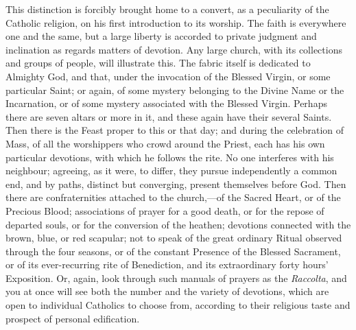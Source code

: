This distinction is forcibly brought home to a convert, as a
peculiarity of the Catholic religion, on his first introduction to its
worship. The faith is everywhere one and the same, but a large liberty
is accorded to private judgment and inclination as regards matters of
devotion. Any large church, with its collections and groups of people,
will illustrate this. The fabric itself is dedicated to Almighty God,
and that, under the invocation of the Blessed Virgin, or some particular
Saint; or again, of some mystery belonging to the Divine Name or the
Incarnation, or of some mystery associated with the Blessed Virgin.
Perhaps there are seven altars or more in it, and these again have their
several Saints. Then there is the Feast proper to this or that day; and
during the celebration of Mass, of all the worshippers who crowd around
the Priest, each has his own particular devotions, with which he follows
the rite. No one interferes with his neighbour; agreeing, as it were, to
differ, they pursue independently a common end, and by paths,
distinct but converging, present themselves before God. Then there are
confraternities attached to the church,—of the Sacred Heart, or of the
Precious Blood; associations of prayer for a good death, or for the
repose of departed souls, or for the conversion of the heathen;
devotions connected with the brown, blue, or red scapular; not to speak
of the great ordinary Ritual observed through the four seasons, or of
the constant Presence of the Blessed Sacrament, or of its ever-recurring
rite of Benediction, and its extraordinary forty hours' Exposition. Or,
again, look through such manuals of prayers as the \emph{Raccolta}, and
you at once will see both the number and the variety of devotions, which
are open to individual Catholics to choose from, according to their
religious taste and prospect of personal edification.

